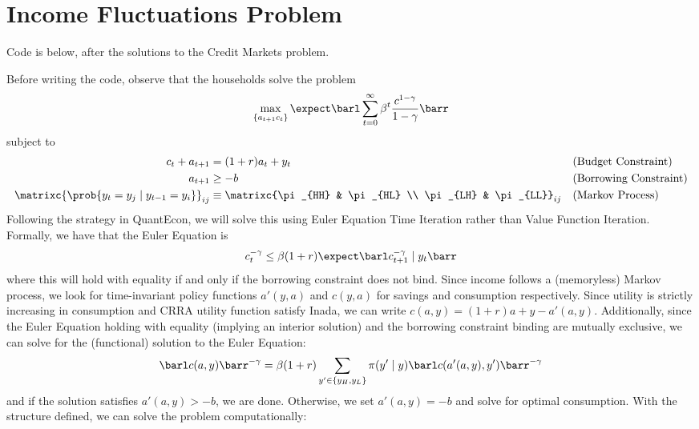 \documentclass[10pt]{article}
\begin{document}
\maketitle

\section*{Income Fluctuations Problem}

\begin{remark}
	Code is below, after the solutions to the Credit Markets problem. 
\end{remark}

Before writing the code, observe that the households solve the problem \[\max_{\{a_{t+1}c_t\}} \expect\barl \sum_{t=0}^\infty \beta^t \frac{c^{1-\gamma}}{1-\gamma}\barr \]subject to\begin{align*} c_t + a_{t+1} &= (1+r)a_t + y_t &&(\text{Budget Constraint}) \\ a_{t+1} &\ge -b &&(\text{Borrowing Constraint)}\\ \matrixc{\prob\{y_t = y_j \mid y_{t-1} = y_i\}}_{ij} &\equiv \matrixc{\pi_{HH} & \pi_{HL} \\ \pi_{LH} & \pi_{LL}}_{ij} &&(\text{Markov Process}) \end{align*}Following the strategy in QuantEcon, we will solve this using Euler Equation Time Iteration rather than Value Function Iteration. Formally, we have that the Euler Equation is \[c_t^{-\gamma} \le \beta (1+r) \expect \barl c_{t+1}^{-\gamma} \mid y_t\barr\]where this will hold with equality if and only if the borrowing constraint does not bind. Since income follows a (memoryless) Markov process, we look for time-invariant policy functions $a'(y,a)$ and $c(y,a)$ for savings and consumption respectively. Since utility is strictly increasing in consumption and CRRA utility function satisfy Inada, we can write $c(a,y) = (1+r)a + y - a'(a,y)$. Additionally, since the Euler Equation holding with equality (implying an interior solution) and the borrowing constraint binding are mutually exclusive, we can solve for the (functional) solution to the Euler Equation:\[\barl c(a,y)\barr^{-\gamma} = \beta (1+r) \sum_{y' \in \{y_H,y_L\}} \pi(y' \mid y) \barl c(a'(a,y),y')\barr^{-\gamma}\]and if the solution satisfies $a'(a,y) > -b$, we are done. Otherwise, we set $a'(a,y) = -b$ and solve for optimal consumption. With the structure defined, we can solve the problem computationally:
\end{document}
